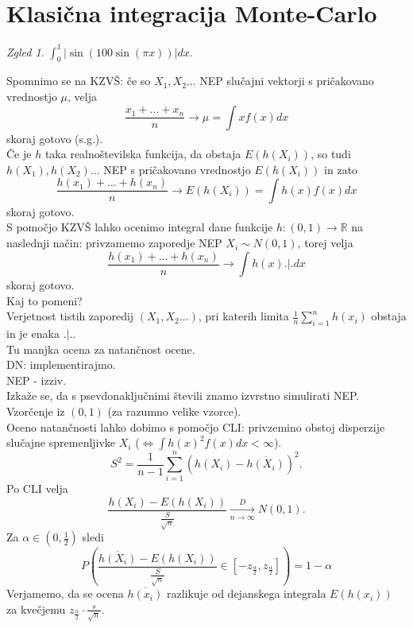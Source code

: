 \documentclass[a4paper, 12pt]{book}
\theoremstyle{definition}
\theoremstyle{remark}
\newtheorem*{exmp}{Zgled}
\newcommand{\R}{\mathbb{R}}
\begin{document}
\section{Klasična integracija Monte-Carlo}

\begin{exmp}
   $\int_{0}^{1} \left| \sin(100 \sin(\pi x))\right| dx$.
\end{exmp}
Spomnimo se na KZVŠ: če so $X_1, X_2 \dots$ NEP slučajni vektorji s pričakovano vrednostjo $\mu$, velja
\begin{equation*}
  \frac{x_1 + \dots + x_n}{n} \to \mu = \int x f(x) dx
\end{equation*}
skoraj gotovo (s.g.). \\
Če je $h$ taka realnoštevilska funkcija, da obstaja $E(h(X_i))$,
so tudi $h(X_1), h(X_2) \dots$ NEP s pričakovano vrednostjo $E(h(X_i))$ in zato
\begin{equation*}
  \frac{h(x_1) + \dots + h(x_n)}{n} \to E(h(X_i)) = \int h(x) f(x) dx
\end{equation*}
skoraj gotovo. \\
S pomočjo KZVŠ lahko ocenimo integral dane funkcije $h: (0,1) \to \R$ na naslednji način:
privzamemo zaporedje NEP $X_i \sim N(0,1)$, torej velja
\begin{equation*}
  \frac{h(x_1) + \dots + h(x_n)}{n} \to \int h(x) .|. dx
\end{equation*}
skoraj gotovo. \\
Kaj to pomeni? \\
Verjetnost tistih zaporedij $(X_1, X_2 \dots)$,
pri katerih limita $\frac{1}{n} \sum_{i=1}^{n} h(x_i)$ obstaja in je enaka $.|.$. \\
Tu manjka ocena za natančnost ocene. \\
DN: implementirajmo. \\
NEP - izziv. \\
Izkaže se, da s psevdonaključnimi števili znamo izvrstno simulirati NEP.
Vzorčenje iz $(0,1)$ (za razumno velike vzorce). \\
Oceno natančnosti lahko dobimo s pomočjo CLI: privzemino obstoj disperzije slučajne spremenljivke $X_i$
($\iff \int h(x)^2 f(x) dx < \infty$).
\begin{equation*}
  S^2 = \frac{1}{n-1} \sum_{i=1}^{n} (h(X_i) - \overline{h(X_i)})^2.
\end{equation*}
Po CLI velja
\begin{equation*}
  \frac{h(X_i) - E(h(X_i))}{\frac{S}{\sqrt{n}}} \xrightarrow[n \to \infty]{D} N(0,1).
\end{equation*}
Za $\alpha \in (0, \frac{1}{2})$ sledi
\begin{equation*}
  P\left(\frac{\overline{h(X_i)} - E(h(X_i))}{\frac{S}{\sqrt{n}}} \in [-z_{\frac{\alpha}{2}}, z_{\frac{\alpha}{2}}]\right) = 1 - \alpha%
\end{equation*}
Verjamemo, da se ocena $\overline{h(x_i)}$ razlikuje od dejanskega integrala $E(h(x_i))$ za kvečjemu
$z_{\frac{\alpha}{2}} \cdot \frac{s}{\sqrt{n}}$.
\end{document}
